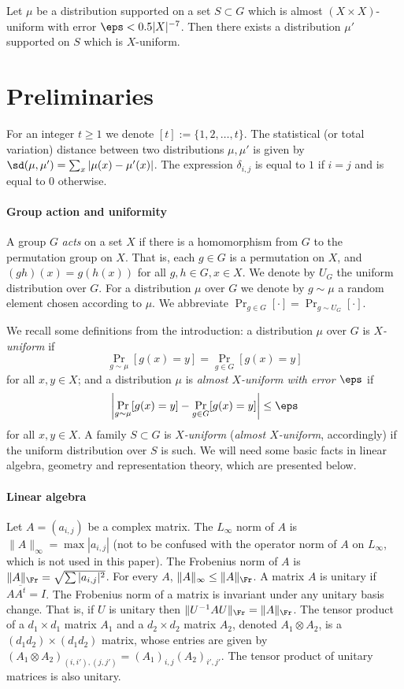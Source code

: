 \begin{theorem}\label{thm:almost_support_uniform}
Let $\mu$ be a distribution supported on a set $S \subset G$ which is
almost $(X \times X)$-uniform with error $\eps < 0.5 |X|^{-7}$. Then
there exists a distribution $\mu'$ supported on $S$ which is $X$-uniform.
\end{theorem}

\section{Preliminaries}
\label{sec:prelim}

For an integer $t \ge 1$ we denote $[t]:=\{1,2,\ldots,t\}$. The statistical (or total variation) distance between two distributions $\mu,\mu'$ is
given by $\sd(\mu,\mu')=\sum_{x} |\mu(x)-\mu'(x)|$. The expression $\delta_{i,j}$ is equal to $1$ if $i=j$ and is equal to $0$ otherwise.



\paragraph{Group action and uniformity}
A group $G$ \emph{acts} on a set $X$ if there is a homomorphism from $G$ to the
permutation group on $X$. That is, each $g \in G$ is a permutation on $X$,
and $(gh)(x)=g(h(x))$ for all $g,h \in G, x \in X$. We denote by $U_G$
the uniform distribution over $G$. For a distribution $\mu$ over $G$ we denote
by $g \sim \mu$ a random element chosen according to $\mu$. We abbreviate $\Pr_{g \in G}[\cdot] = \Pr_{g \sim U_G}[\cdot]$.

We recall some definitions from the
introduction: a distribution $\mu$ over $G$ is \emph{$X$-uniform} if
$$
\Pr_{g \sim \mu}[g(x)=y] = \Pr_{g \in G}[g(x)=y]
$$
for all $x,y \in X$; and a distribution $\mu$ is
\emph{almost $X$-uniform with error $\eps$} if
$$
\left| \Pr_{g \sim \mu}[g(x)=y] -
\Pr_{g \in G}[g(x)=y] \right| \le \eps
$$
for all $x,y \in X$. A family $S \subset G$ is \emph{$X$-uniform} (\emph{almost
$X$-uniform}, accordingly) if the uniform distribution over $S$ is such. We will need
some basic facts in linear algebra, geometry and representation theory,
which are presented below.

\paragraph{Linear algebra}
Let $A=(a_{i,j})$ be a complex matrix. The $L_{\infty}$ norm of $A$ is $\|A\|_{\infty}=\max
|a_{i,j}|$ (not to be confused with the operator norm of $A$ on $L_{\infty}$, which is not used in this paper).
The Frobenius norm of $A$ is $\|A\|_{\Fr} = \sqrt{\sum
|a_{i,j}|^2}$. For every $A$, $\|A\|_{\infty} \le \|A\|_{\Fr}$. A matrix
$A$ is unitary if $A \overline{A^t} = I$. The Frobenius
norm of a matrix is invariant under any unitary
basis change. That is, if $U$
is unitary then $\|U^{-1} A U\|_{\Fr} = \|A\|_{\Fr}$. The tensor product
of a $d_1 \times d_1$ matrix $A_1$ and a $d_2 \times d_2$ matrix $A_2$,
denoted $A_1 \otimes A_2$, is a $(d_1 d_2) \times (d_1 d_2)$ matrix, whose
entries are given by $(A_1 \otimes A_2)_{(i,i'),(j,j')} = (A_1)_{i,j}
(A_2)_{i',j'}$. The tensor product of unitary matrices is
also unitary.

